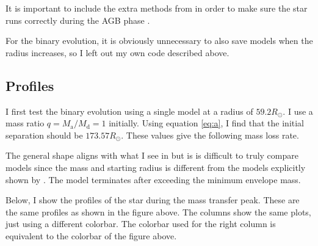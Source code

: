 \documentclass[a4paper,10pt]{article}
\begin{document}
    It is important to include the extra methods from \citet{rees2024b} in order to make sure the star runs correctly during the AGB phase
    .

    For the binary evolution, it is obviously unnecessary to also save models when the radius increases, so I left out my own code described above.

    \subsection{Profiles}

    I first test the binary evolution using a single model at a radius of \(59.2 R_\odot \). I use a mass ratio \(q = M _\text{a} / M _\text{d} = 1\) initially. Using equation \eqref{eq:a}, I find that the initial separation should be \(173.57R_\odot \). These values give the following mass loss rate.

    \begin{figure}[ht]
        \centering
    \end{figure}

    The general shape aligns with what I see in \citet{temmink2022} but is is difficult to truly compare models since the mass and starting radius is different from the models explicitly shown by \citet{temmink2022}.
    The model terminates after exceeding the minimum envelope mass.

    Below, I show the profiles of the star during the mass transfer peak. These are the same profiles as shown in the figure above. The columns show the same plots, just using a different colorbar.
    The colorbar used for the right column is equivalent to the colorbar of the figure above.

    \begin{figure}[ht]
        \centering
    \end{figure}
    
\end{document}
